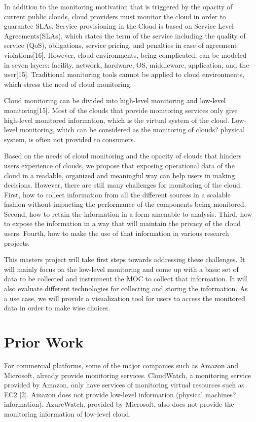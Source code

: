 \documentclass[11pt, oneside]{article}   	%
\begin{document}
	
	In addition to the monitoring motivation that is triggered by the opacity of current public clouds, cloud providers must monitor the cloud in order to guarantee SLAs. Service provisioning in the Cloud is based on Service Level Agreements(SLAs), which states the term of the service including the quality of service (QoS), obligations, service pricing, and penalties in case of agreement violations[16]. However, cloud environments, being complicated, can be modeled in seven layers: facility, network, hardware, OS, middleware, application, and the user[15]. Traditional monitoring tools cannot be applied to cloud environments, which stress the need of cloud monitoring.
	
	
	Cloud monitoring can be divided into high-level monitoring and low-level monitoring[15]. Most of the clouds that provide monitoring services only give high-level monitored information, which is the virtual system of the cloud. Low-level monitoring, which can be considered as the monitoring of clouds? physical system, is often not provided to consumers. 
	
	
	Based on the needs of cloud monitoring and the opacity of clouds that hinders users experience of clouds, we propose that exposing operational data of the cloud in a readable, organized and meaningful way can help users in making decisions. However, there are still many challenges for monitoring of the cloud. First, how to collect information from all the different sources in a scalable fashion without impacting the performance of the components being monitored. Second, how to retain the information in a form amenable to analysis. Third, how to expose the information in a way that will maintain the privacy of the cloud users. Fourth, how to make the use of that information in various research projects.
	
	
	This masters project will take first steps towards addressing these challenges. It will mainly focus on the low-level monitoring and come up with a basic set of data to be collected and instrument the MOC to collect that information. It will also evaluate different technologies for collecting and storing the information. As a use case, we will provide a visualization tool for users to access the monitored data in order to make wise choices. 

\section {Prior Work}

For commercial platforms, some of the major companies such as Amazon and Microsoft, already provide monitoring services. CloudWatch, a monitoring service provided by Amazon, only have services of monitoring virtual resources such as EC2 [2]. Amazon does not provide low-level information (physical machines? information). AzureWatch, provided by Microsoft, also does not provide the monitoring information of low-level cloud. 
\end{document}
